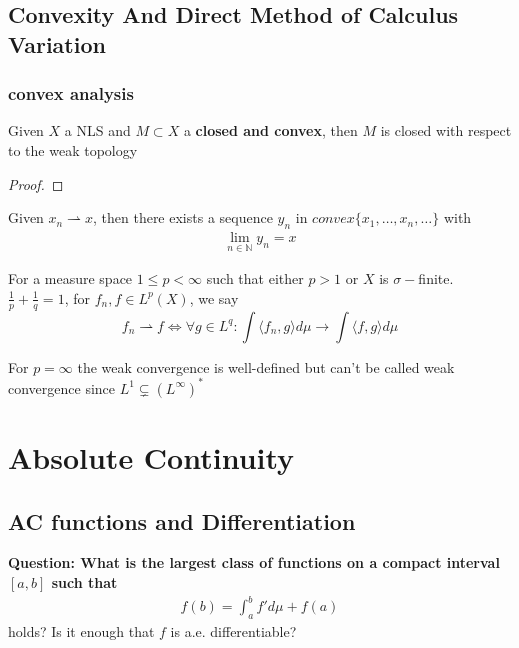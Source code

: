 \subsection{Convexity And Direct Method of Calculus Variation}
\subsubsection{convex analysis}
\begin{theorem}
	Given $X$ a NLS and $M\subset X$ a \textbf{closed and convex}, then $M$ is closed with respect to the weak topology
\end{theorem}
\begin{proof}
	
\end{proof}

\begin{corollary}[Mazur]
	Given $x_n \rightharpoonup x$, then there exists a sequence $y_n$ in $convex\{x_1, \dots, x_n, \dots \}$ with 
	\begin{align*}
		\lim_{n \in \mathbb{N}} y_n = x
	\end{align*}
\end{corollary}

\begin{definition}
For a measure space $1 \leq p < \infty$ such that either $p>1$ or $X$ is $\sigma-$finite. $\frac{1}{p} + \frac{1}{q} = 1$, for $f_n, f \in L^p(X)$, we say
\begin{equation*}
	f_n \rightharpoonup f \Leftrightarrow \forall g \in L^q :   \int \langle f_n, g \rangle d\mu \rightarrow \int \langle f, g \rangle d\mu 
\end{equation*}
\end{definition}
\begin{remark}
For $p = \infty$ the weak convergence is well-defined but can't be called weak convergence since $L^1 \subsetneq (L^\infty)^*$	
\end{remark}



\newpage
\section{Absolute Continuity}
\subsection{AC functions and Differentiation}
\textbf{Question: What is the largest class of functions on a compact interval $[a, b]$ such that }
\begin{align*}
	f(b) = \int_a^b f'd\mu + f(a)
\end{align*}
holds? Is it enough that $f$ is a.e. differentiable?

